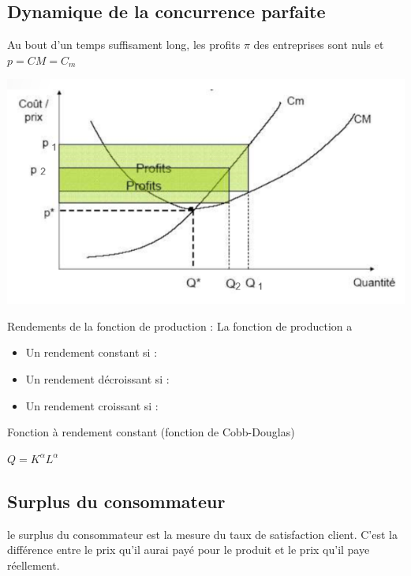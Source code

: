 \subsection{Dynamique de la concurrence parfaite}
Au bout d'un temps suffisament long, les profits $\pi$ des entreprises sont nuls et $p=CM=C_{m}$
\begin{center}
    \includegraphics[scale=0.8]{Pics/dyn_concu_parfaite.png}
\end{center}
Rendements de la fonction de production : \newline
La fonction de production a 
\begin{itemize}
    \item Un rendement constant si :
    \begin{center}
        \Large{}
    \end{center}
    \item Un rendement décroissant si :
    \begin{center}
        \Large{}
    \end{center}
        \item Un rendement croissant si :
    \begin{center}
        \Large{}
    \end{center}
\end{itemize}
Fonction à rendement constant (fonction de Cobb-Douglas)
\begin{center}
    \Large{$Q = K^{\alpha}L^{\alpha}$}
\end{center}
\newpage
\subsection{Surplus du consommateur}
le surplus du consommateur est la mesure du taux de satisfaction client. C'est la différence entre le prix qu'il aurai payé pour le produit et le prix qu'il paye réellement.

